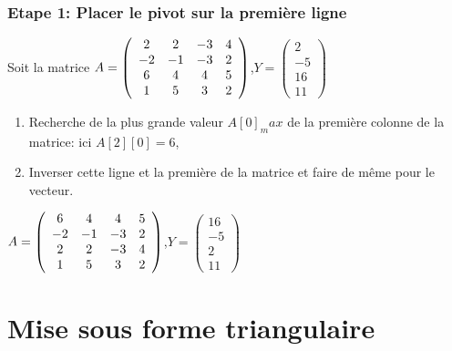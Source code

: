 \begin{frame}[fragile]
\frametitle{Etape 1: Placer le pivot sur la première ligne}

Soit la matrice $A=\left(\begin{array}{c c c c}
2 & 2 & -3 & 4 \\
-2 & -1 & -3 & 2 \\
6 & 4 & 4 & 5 \\
1 & 5 & 3 & 2
\end{array}\right)$,$Y=\left(\begin{array}{c}
2 \\
-5 \\
16 \\
11
\end{array}\right)$

\begin{enumerate}
 \item Recherche de la plus grande valeur $A[0]_max$ de la première colonne de la matrice: ici $A[2][0]=6$,
 \item Inverser cette ligne et la première de la matrice et faire de même pour le vecteur.
\end{enumerate}

$A=\left(\begin{array}{c c c c}
6 & 4 & 4 & 5 \\
-2 & -1 & -3 & 2 \\
2 & 2 & -3 & 4 \\
1 & 5 & 3 & 2
\end{array}\right)$,$Y=\left(\begin{array}{c}
16 \\
-5 \\
2 \\
11
\end{array}\right)$

\end{frame}

\section{Mise sous forme triangulaire}

